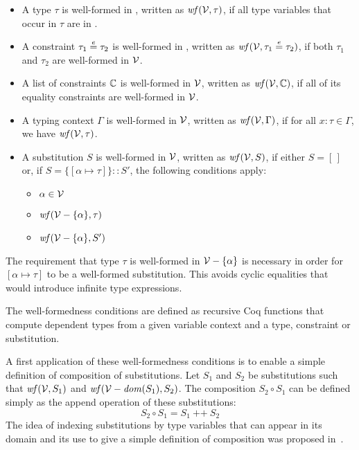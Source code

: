 \begin{itemize}

  \item A type $\tau$ is well-formed in \V, written as $\text{\it wf\/}(\mathcal{V},\tau)$,
    if all type variables that occur in $\tau$ are in \V.

  \item A constraint $\tau_1 \overset{e}{=} \tau_2$ is well-formed in \V,
    written as $\text{\it wf\/}(\mathcal{V},\tau_1 \overset{e}{=} \tau_2)$, if both $\tau_1$ and
    $\tau_2$ are well-formed in $\mathcal{V}$.

  \item A list of constraints $\mathbb{C}$ is well-formed in $\mathcal{V}$, written as
    $\text{\it wf\/}(\mathcal{V},\mathbb{C})$, if all of its equality constraints are well-formed
    in $\mathcal{V}$.

  \item A typing context $\Gamma$ is well-formed in $\mathcal{V}$, written as
    $\text{\it wf\/}(\mathcal{V},\Gamma)$, if for all $x : \tau \in \Gamma$, we have
    $\text{\it wf\/}(\mathcal{V},\tau)$.

  \item A substitution $S$ is well-formed in $\mathcal{V}$, written as
    $\text{\it wf\/}(\mathcal{V},S)$, if either $S=[\,]$ or, if $S = \{[\alpha\mapsto
    \tau]\}:: S'$, the following conditions apply:
     \begin{itemize}
       \item $\alpha\in\mathcal{V}$
       \item $\text{\it wf\/}(\mathcal{V} - \{\alpha\},\tau)$
       \item $\text{\it wf\/}(\mathcal{V}-\{\alpha\},S')$
     \end{itemize}

  \end{itemize}

The requirement that type $\tau$ is well-formed in $\mathcal{V} - \{\alpha\}$
is necessary in order for $[\alpha\mapsto \tau]$ to be a well-formed
substitution. This avoids cyclic equalities that would introduce
infinite type expressions.

The well-formedness conditions are defined as recursive Coq functions
that compute dependent types from a given variable context and a type,
constraint or substitution.

A first application of these well-formedness conditions is to enable a
simple definition of composition of substitutions.  Let $S_1$ and
$S_2$ be substitutions such that $\text{\it wf\/}(\mathcal{V},S_1)$ and
$\text{\it wf\/}(\mathcal{V}-\text{\it dom\/}(S_1),S_2)$. The composition $S_2 \circ S_1$ can be
defined simply as the append operation of these substitutions:
\[ S_2 \circ S_1 = S_1\: \texttt{++}\: S_2 \]
The idea of indexing substitutions by type variables that can appear
in its domain and its use to give a simple definition of composition
was proposed in~.

